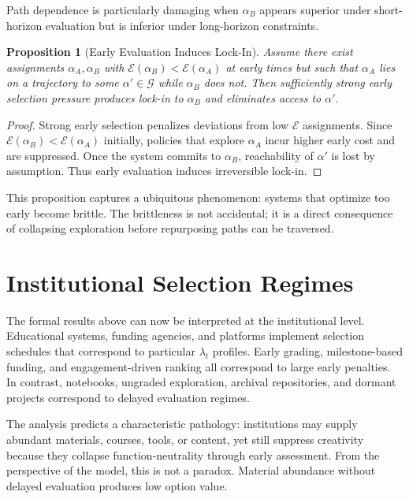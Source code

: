 \documentclass[11pt]{article}
\newtheorem{proposition}{Proposition}
\theoremstyle{definition}
\begin{document}
Path dependence is particularly damaging when $\alpha_B$ appears superior under short-horizon evaluation but is inferior under long-horizon constraints.

\begin{proposition}[Early Evaluation Induces Lock-In]
Assume there exist assignments $\alpha_A,\alpha_B$ with $\mathcal{E}(\alpha_B)<\mathcal{E}(\alpha_A)$ at early times but such that $\alpha_A$ lies on a trajectory to some $\alpha'\in\mathcal{G}$ while $\alpha_B$ does not. Then sufficiently strong early selection pressure produces lock-in to $\alpha_B$ and eliminates access to $\alpha'$.
\end{proposition}

\begin{proof}
Strong early selection penalizes deviations from low $\mathcal{E}$ assignments. Since $\mathcal{E}(\alpha_B)<\mathcal{E}(\alpha_A)$ initially, policies that explore $\alpha_A$ incur higher early cost and are suppressed. Once the system commits to $\alpha_B$, reachability of $\alpha'$ is lost by assumption. Thus early evaluation induces irreversible lock-in.
\end{proof}

This proposition captures a ubiquitous phenomenon: systems that optimize too early become brittle. The brittleness is not accidental; it is a direct consequence of collapsing exploration before repurposing paths can be traversed.

\section{Institutional Selection Regimes}

The formal results above can now be interpreted at the institutional level. Educational systems, funding agencies, and platforms implement selection schedules that correspond to particular $\lambda_t$ profiles. Early grading, milestone-based funding, and engagement-driven ranking all correspond to large early penalties. In contrast, notebooks, ungraded exploration, archival repositories, and dormant projects correspond to delayed evaluation regimes.

The analysis predicts a characteristic pathology: institutions may supply abundant materials, courses, tools, or content, yet still suppress creativity because they collapse function-neutrality through early assessment. From the perspective of the model, this is not a paradox. Material abundance without delayed evaluation produces low option value.
\end{document}
